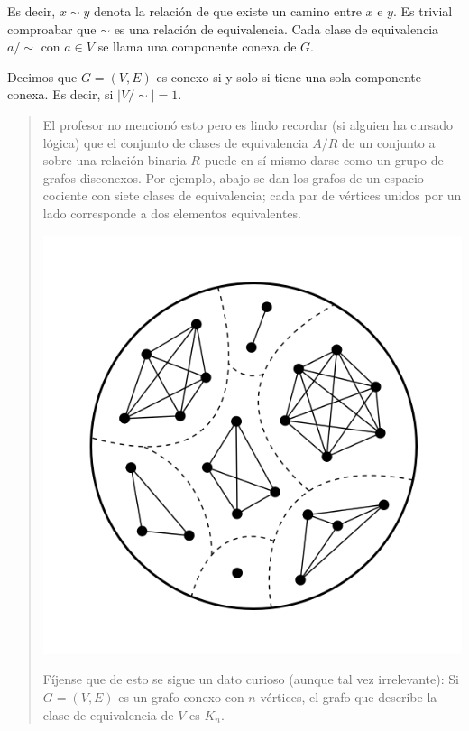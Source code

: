 \documentclass[a4paper]{article}
\begin{document}
Es decir, $x \sim y$ denota la relación de que existe un camino entre $x$ e $y$.
Es trivial comproabar que $\sim$ es una relación de equivalencia. Cada clase de
equivalencia $a / \sim$ con $a \in V$ se llama una componente conexa de $G$.

\begin{definition}
    Decimos que $G = (V, E) $ es conexo si y solo si tiene una sola componente
    conexa. Es decir, si $|V / \sim | = 1$.
\end{definition}


\small
\begin{quote}

El profesor no mencionó esto pero es lindo recordar (si alguien ha cursado
lógica) que el conjunto de clases de equivalencia $A / R$ de un conjunto a sobre
una relación binaria $R$ puede en sí mismo darse como un grupo de grafos
disconexos. Por ejemplo, abajo se dan los grafos de un espacio cociente con
siete clases de equivalencia; cada par de vértices unidos por un lado
corresponde a dos elementos equivalentes.


\begin{center}
\includegraphics[scale=0.25]{equiv}
\end{center}

Fíjense que de esto se sigue un dato curioso (aunque tal vez irrelevante): Si
$G = (V, E) $ es un grafo conexo con $n$ vértices, el grafo que describe la clase de
equivalencia de $V$ es $K_n$.

\end{quote}
\normalsize
\end{document}
